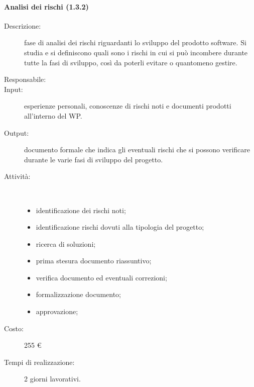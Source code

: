 \paragraph{Analisi dei rischi (1.3.2)}
\begin{description}
\item[Descrizione:] fase di analisi dei rischi riguardanti lo sviluppo del prodotto software. Si studia e si definiscono quali sono i rischi in cui si pu\`{o} incombere durante tutte la fasi di sviluppo, cos\`{i} da poterli evitare o quantomeno gestire.
\item[Responsabile:] 
\item[Input:] esperienze personali, conoscenze di rischi noti e documenti prodotti all'interno del WP.
\item[Output:] documento formale che indica gli eventuali rischi che si possono verificare durante le varie fasi di sviluppo del progetto.
\item[Attività:]\mbox{}\\[-1.5\baselineskip]
	\begin{itemize}
	\item identificazione dei rischi noti;
	\item identificazione rischi dovuti alla tipologia del progetto;
	\item ricerca di soluzioni;
	\item prima stesura documento riassuntivo;
	\item verifica documento ed eventuali correzioni;
	\item formalizzazione documento;
	\item approvazione;
	\end{itemize}
\item[Costo:] 255 \euro{}
\item[Tempi di realizzazione:] 2 giorni lavorativi.
\end{description}

